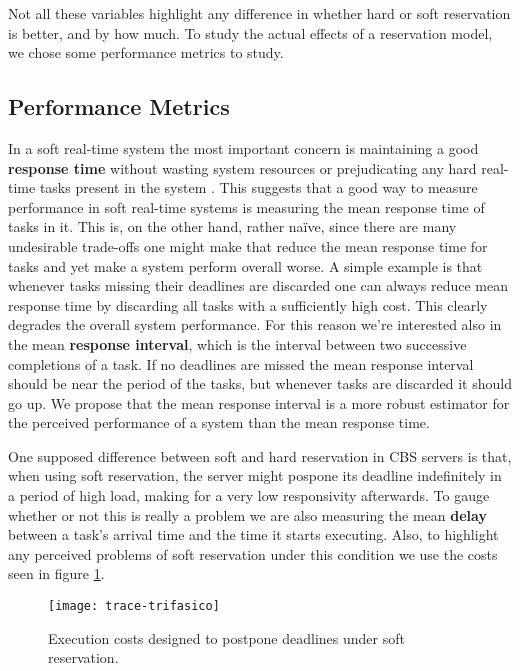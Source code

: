 \documentclass[times, 10pt,twocolumn]{article}
\begin{document}
Not all these variables highlight any difference in whether hard or
soft reservation is better, and by how much. To study the actual
effects of a reservation model, we chose some performance metrics to study.

\subsection{Performance Metrics}
\label{sec:metrics}

In a soft real-time system the most important concern is maintaining a
good \textbf{response time} without wasting system resources or
prejudicating any hard real-time tasks present in the system
\cite{buttazzo05:soft}. This suggests that a good way to measure
performance in soft real-time systems is measuring the mean response
time of tasks in it. This is, on the other hand, rather naïve, since
there are many undesirable trade-offs one might make that reduce the
mean response time for tasks and yet make a system perform overall
worse. A simple example is that whenever tasks missing their deadlines
are discarded one can always reduce mean response time by discarding
all tasks with a sufficiently high cost. This clearly degrades the
overall system performance. For this reason we're interested also in
the mean \textbf{response interval}, which is the interval between two
successive completions of a task. If no deadlines are missed the mean
response interval should be near the period of the tasks, but whenever
tasks are discarded it should go up. We propose that the mean response
interval is a more robust estimator for the perceived performance of a
system than the mean response time.

One supposed difference between soft and hard reservation in CBS
servers is that, when using soft reservation, the server might pospone
its deadline indefinitely in a period of high load, making for a very
low responsivity afterwards. To gauge whether or not this is really a
problem we are also measuring the mean \textbf{delay} between a task's
arrival time and the time it starts executing. Also, to highlight any
perceived problems of soft reservation under this condition we use the
costs seen in figure \ref{fig:costs-trifasico}.

\begin{figure}[t]
  \centering
  \texttt{[image: trace-trifasico]}
  \caption{Execution costs designed to postpone deadlines under soft reservation.}
  \label{fig:costs-trifasico}
\end{figure}
\end{document}
